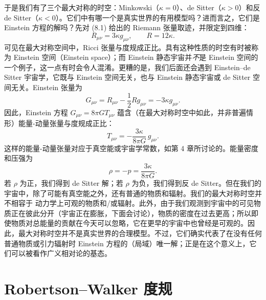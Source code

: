 于是我们有了三个最大对称的时空：Minkowski（$\kappa=0$）、de Sitter（$\kappa>0$）和反 de Sitter（$\kappa<0$）。它们中有哪一个是真实世界的有用模型吗？进而言之，它们是 Einstein 方程的解吗？先对 (8.1) 给出的 Riemann 张量取迹，并限定到四维：
\begin{equation*}
R_{\mu\nu} = 3\kappa g_{\mu\nu},\qquad R = 12\kappa.
\tag{8.17}
\end{equation*}
可见在最大对称空间中，Ricci 张量与度规成正比。具有这种性质的时空有时被称为 Einstein 空间（Einstein space）；而 Einstein 静态宇宙并\emph{不}是 Einstein 空间的一个例子，这一点有时会令人混淆。更糟的是，我们后面还会遇到 Einstein–de Sitter 宇宙学，它既与 Einstein 空间无关，也与 Einstein 静态宇宙或 de Sitter 空间无关。Einstein 张量为
\begin{equation*}
G_{\mu\nu} = R_{\mu\nu} - \frac{1}{2}Rg_{\mu\nu} = -3\kappa g_{\mu\nu}.
\tag{8.18}
\end{equation*}
因此，Einstein 方程 $G_{\mu\nu}=8\pi G T_{\mu\nu}$ 蕴含（在最大对称时空中如此，并非普遍情形）能量-动量张量与度规成正比：
\begin{equation*}
T_{\mu\nu} = -\frac{3\kappa}{8\pi G}\,g_{\mu\nu}.
\tag{8.19}
\end{equation*}
这样的能量-动量张量对应于真空能或宇宙学常数，如第 4 章所讨论的。能量密度和压强为
\begin{equation*}
\rho = -p = \frac{3\kappa}{8\pi G}.
\tag{8.20}
\end{equation*}
若 $\rho$ 为正，我们得到 de Sitter 解；若 $\rho$ 为负，我们得到反 de Sitter。但在我们的宇宙中，除了可能有真空能之外，还有普通的物质和辐射。我们的最大对称时空并不相容于
动力学上可观的物质和/或辐射。此外，由于我们观测到宇宙中的可见物质正在彼此分开（宇宙正在膨胀，下面会讨论），物质的密度在过去更高；所以即使物质对总能量的贡献在今天可以忽略，它在更早的宇宙中也曾经是可观的。因此，最大对称时空并不是真实世界的合理模型。不过，它们确实代表了在没有任何普通物质或引力辐射时 Einstein 方程的（局域）唯一解；正是在这个意义上，它们可以被看作广义相对论的基态。

\section{Robertson–Walker 度规}

